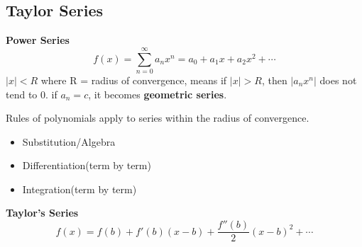 \documentclass{article}
\begin{document}
\subsection{Taylor Series}

\textbf{Power Series}
$$f(x) = \sum_{n=0}^\infty a_nx^n = a_0 + a_1x + a_2x^2 + \cdots$$
$|x| < R$ where R = radius of convergence, means if $|x| > R$, then $|a_nx^n|$ does not tend to 0. if $a_n = c$, it becomes \textbf{geometric series}.

Rules of polynomials apply to series within the radius of convergence.
\begin{itemize}
  \item Substitution/Algebra
  \item Differentiation(term by term)
  \item Integration(term by term)
\end{itemize}

\textbf{Taylor's Series}
$$f(x) = f(b) + f'(b)(x-b) + \frac{f''(b)}{2}(x-b)^2 + \cdots $$
\end{document}
